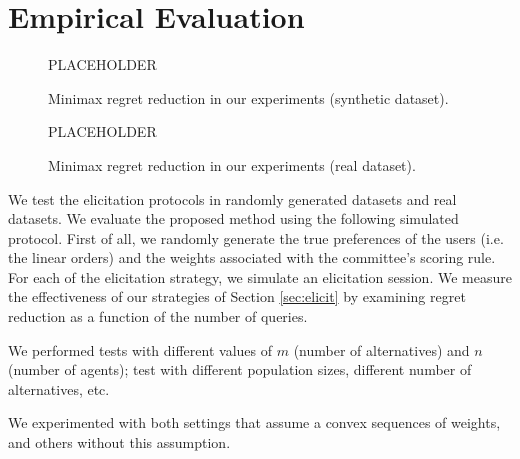 \documentclass[12pt]{article}
\DeclareMathOperator{\MMR}{MMR}
\begin{document}

\section{Empirical Evaluation} \label{sec:experiments}

\begin{figure}[t]
\begin{center}PLACEHOLDER\end{center}
\vspace{3.5cm}
\caption{Minimax regret reduction in our experiments (synthetic dataset).}
\end{figure}

\begin{figure}[t]
\begin{center}PLACEHOLDER\end{center}
\vspace{3.5cm}
\caption{Minimax regret reduction in our experiments (real dataset).}
\end{figure}

We test the elicitation protocols in randomly generated datasets and real datasets. %
We evaluate the proposed method using the following simulated protocol.
First of all, we randomly generate the true preferences of the users (i.e. the linear orders) and the weights associated with the committee's scoring rule.
For each of the elicitation strategy, we simulate an elicitation session.
We measure the effectiveness of our strategies of Section \ref{sec:elicit} by examining regret reduction as a function of the number of queries.

We performed tests with different values of $m$ (number of alternatives) and $n$ (number of agents); test with different population sizes, different number of alternatives, etc.

We experimented with both settings that assume a convex sequences of weights, and others without this assumption.

\end{document}
